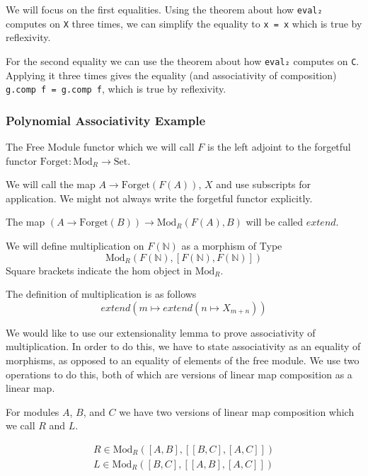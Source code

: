 \documentclass[12pt]{article} %
\theoremstyle{definition}
\theoremstyle{definition}
\theoremstyle{definition}
\theoremstyle{definition}
\begin{document}
We will focus on the first equalities. Using the theorem about how \lstinline{eval₂}
computes on \lstinline{X} three times, we can simplify the equality to \lstinline{x = x} which is true 
by reflexivity.

For the second equality we can use the theorem about how \lstinline{eval₂}
computes on \lstinline{C}. Applying it three times gives the equality
(and associativity of composition) \lstinline{g.comp f = g.comp f}, which is true by reflexivity.

\subsubsection{Polynomial Associativity Example}

The Free Module functor which we will call $F$ is the left adjoint to the forgetful 
functor $\text{Forget} : \text{Mod}_R \to \text{Set}$.

We will call the map $A \to \text{Forget}(F(A))$, $X$ and use subscripts for application.
We might not always write the forgetful functor explicitly.

The map $(A \to \text{Forget}(B)) \to {\text{Mod}_R}(F(A), B)$ will be called $extend$.

We will define multiplication on $F(\mathbb{N})$ as a morphism of Type 
\begin{equation}
  \text{Mod}_R(F(\mathbb{N}), [F(\mathbb{N}), F(\mathbb{N})])
\end{equation} 
Square brackets indicate the hom object in $\text{Mod}_R$.

The definition of multiplication is as follows
\begin{equation}
  extend (m \mapsto extend (n \mapsto X_{m + n}))
\end{equation}

We would like to use our extensionality lemma to prove associativity of multiplication.
In order to do this, we have to state associativity as an equality of morphisms,
as opposed to an equality of elements of the free module. We use two operations
to do this, both of which are versions of linear map composition as a linear map.

For modules $A$, $B$, and $C$ we have two versions of linear map 
composition which we call $R$ and $L$.

\begin{equation}
  \begin{aligned}
    R \in \text{Mod}_R([A, B], [[B,C],[A,C]]) \\
     L \in \text{Mod}_R([B, C], [[A,B],[A,C]])
  \end{aligned}
\end{equation}
\end{document}
